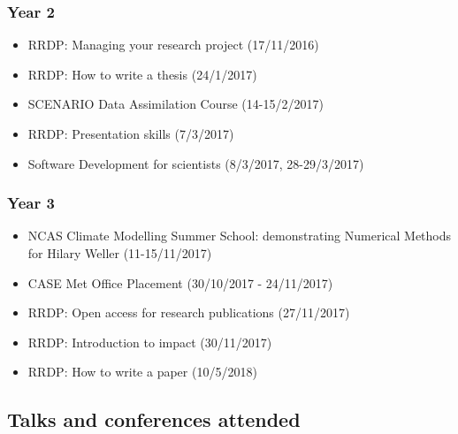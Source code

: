 \documentclass[11pt,a4paper]{article}
\begin{document}
\subsubsection*{Year 2}

\begin{itemize}
  \item RRDP: Managing your research project (17/11/2016)
  \item RRDP: How to write a thesis (24/1/2017)
  \item SCENARIO Data Assimilation Course (14-15/2/2017)
  \item RRDP: Presentation skills (7/3/2017)
  \item Software Development for scientists (8/3/2017, 28-29/3/2017)
\end{itemize}

\subsubsection*{Year 3}

\begin{itemize}
  \item NCAS Climate Modelling Summer School: demonstrating Numerical Methods for Hilary Weller (11-15/11/2017)
  \item CASE Met Office Placement (30/10/2017 - 24/11/2017)
  \item RRDP: Open access for research publications (27/11/2017)
  \item RRDP: Introduction to impact (30/11/2017)
  \item RRDP: How to write a paper (10/5/2018)
\end{itemize}

\subsection*{Talks and conferences attended}
\end{document}

